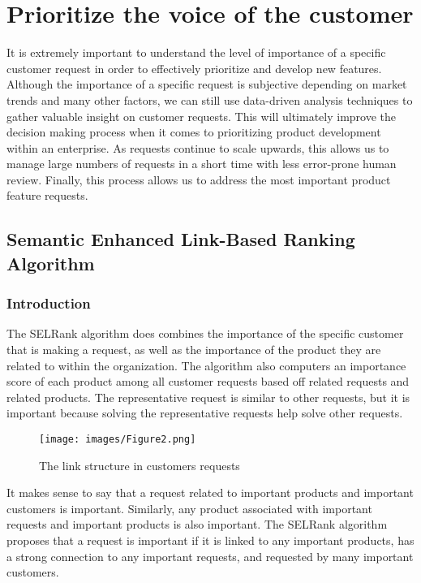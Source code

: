 \documentclass[sigconf]{acmart}
\begin{document}
\section{Prioritize the voice of the customer}
It is extremely important to understand the level of importance of a specific customer request in order to effectively prioritize and develop new features. Although the importance of a specific request is subjective depending on market trends and many other factors, we can still use data-driven analysis techniques to gather valuable insight on customer requests. This will ultimately improve the decision making process when it comes to prioritizing product development within an enterprise. As requests continue to scale upwards, this allows us to manage large numbers of requests in a short time with less error-prone human review. Finally, this process allows us to address the most important product feature requests. 

\subsection{Semantic Enhanced Link-Based Ranking Algorithm}

\subsubsection{Introduction}
The SELRank algorithm does combines the importance of the specific customer that is making a request, as well as the importance of the product they are related to within the organization. The algorithm also computers an importance score of each product among all customer requests based off related requests and related products. The representative request is similar to other requests, but it is important because solving the representative requests help solve other requests.


\begin{figure}
    \centering
    \texttt{[image: images/Figure2.png]}
    \caption{The link structure in customers requests}
    \label{fig:1}
\end{figure}

It makes sense to say that a request related to important products and important customers is important. Similarly, any product associated with important requests and important products is also important. The SELRank algorithm proposes that a request is important if it is linked to any important products, has a strong connection to any important requests, and requested by many important customers. 
\end{document}
